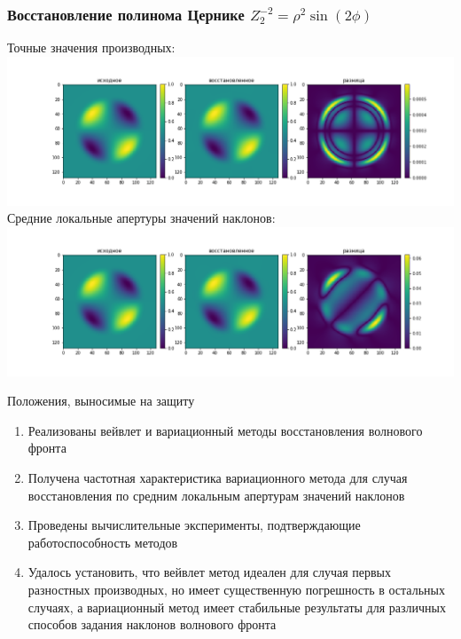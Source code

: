 \documentclass[11pt]{beamer}
\begin{document}
\begin{frame}
\frametitle{Восстановление полинома Цернике $Z_2^{-2} = \rho^2 \sin(2\phi)$}
Точные значения производных:
\includegraphics[width=1\linewidth]{z_2^-2.png}
\\
Средние локальные апертуры значений наклонов:
\includegraphics[width=1\linewidth]{z_2^-2_v2.png}


\end{frame}
\begin{frame}{Положения, выносимые на защиту}
\begin{enumerate}
\item Реализованы вейвлет и вариационный методы восстановления волнового фронта
\item Получена частотная характеристика вариационного метода для случая восстановления по средним локальным апертурам значений наклонов
\item Проведены вычислительные эксперименты, подтверждающие работоспособность методов
\item Удалось установить, что вейвлет метод идеален для случая первых разностных производных, но имеет существенную погрешность в остальных случаях, а вариационный метод имеет стабильные результаты для различных способов задания наклонов волнового фронта
\end{enumerate}
\end{frame}

\begin{frame}
\end{frame}
\end{document}
